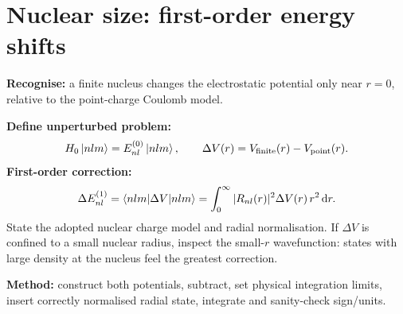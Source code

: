 
\section{Nuclear size: first-order energy shifts}
\textbf{Recognise:} a finite nucleus changes the electrostatic
potential only near \(r=0\), relative to the point-charge Coulomb model.

\textbf{Define unperturbed problem:}
\[
H_0\left\lvert nlm\right\rangle=E_{nl}^{(0)}\left\lvert nlm\right\rangle,\qquad
\Delta V(r)=V_{\mathrm{finite}}(r)-V_{\mathrm{point}}(r).
\]
\textbf{First-order correction:}
\[
\Delta E_{nl}^{(1)}=\langle nlm|\Delta V|nlm\rangle
=\int_0^\infty |R_{nl}(r)|^2\Delta V(r)\,r^2\,\mathrm{d} r.
\]
State the adopted nuclear charge model and radial normalisation.
If \(\Delta V\) is confined to a small nuclear radius,
inspect the small-\(r\) wavefunction: states with large density
at the nucleus feel the greatest correction.
\begin{methodbox}
\textbf{Method:} construct both potentials, subtract, set physical
integration limits, insert correctly normalised radial state,
integrate and sanity-check sign/units.
\end{methodbox}

